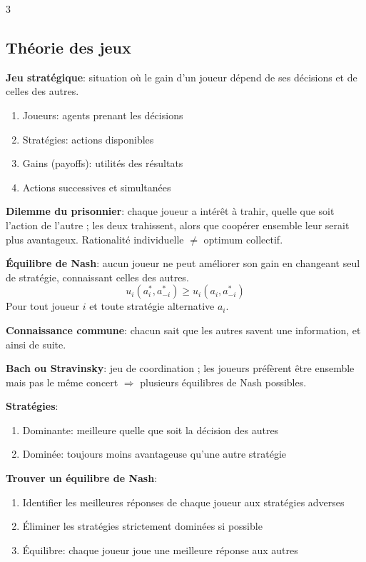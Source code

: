 \documentclass[12pt, a4paper]{article}
\begin{document}
\begin{multicols*}{3}
\colbreak
\subsection{Théorie des jeux}

\textbf{Jeu stratégique}: situation où le gain d'un joueur dépend de ses décisions et de celles des autres.
\begin{enumerate}[\roman*.]
  \item Joueurs: agents prenant les décisions
  \item Stratégies: actions disponibles
  \item Gains (payoffs): utilités des résultats
  \item Actions successives et simultanées 
\end{enumerate}

\textbf{Dilemme du prisonnier}: chaque joueur a intérêt à trahir, quelle que soit l'action de l'autre ; les deux trahissent, alors que coopérer ensemble leur serait plus avantageux. Rationalité individuelle $\neq$ optimum collectif.

\textbf{Équilibre de Nash}: aucun joueur ne peut améliorer son gain en changeant seul de stratégie, connaissant celles des autres.
\[
\boxed{u_i(a_i^*,a_{-i}^*)\geq
u_i(a_i,a_{-i}^*)}
\]
Pour tout joueur $i$ et toute stratégie alternative $a_i$.

\textbf{Connaissance commune}: chacun sait que les autres savent une information, et ainsi de suite.

\textbf{Bach ou Stravinsky}: jeu de coordination ; les joueurs préfèrent être ensemble mais pas le même concert $\Rightarrow$ plusieurs équilibres de Nash possibles.

\textbf{Stratégies}:
\begin{enumerate}[\roman*.]
  \item Dominante: meilleure quelle que soit la décision des autres
  \item Dominée: toujours moins avantageuse qu'une autre stratégie
\end{enumerate}

\textbf{Trouver un équilibre de Nash}:
\begin{enumerate}[\roman*.]
  \item Identifier les meilleures réponses de chaque joueur aux stratégies adverses
  \item Éliminer les stratégies strictement dominées si possible
  \item Équilibre: chaque joueur joue une meilleure réponse aux autres
\end{enumerate}


\end{multicols*}
\end{document}
